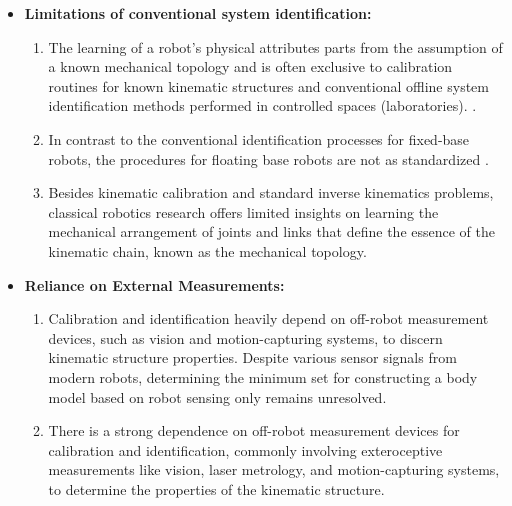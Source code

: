 \documentclass[12pt, a4paper]{article}
\begin{document}
\begin{itemize}
    \item \textbf{Limitations of conventional system identification:} 
	\begin{enumerate}
		\item The learning of a robot's physical attributes parts from the assumption of a known mechanical topology and is often exclusive to calibration routines for known kinematic structures \cite{Hollerbach1996CalibrationIndexTaxonomy} and conventional offline system identification methods performed in controlled spaces (laboratories). \cite{Swevers2007Dynamicmodelidentification,LeboutetInertialParameterIdentification}.
		\item In contrast to the conventional identification processes for fixed-base robots, the procedures for floating base robots are not as standardized \cite{Ayusawa2014Identifiabilityidentificationinertial,Lee2022OptimizedSystemIdentification}.    	
		\item Besides kinematic calibration and standard inverse kinematics problems, classical robotics research offers limited insights on learning the mechanical arrangement of joints and links that define the essence of the kinematic chain, known as the mechanical topology.

	\end{enumerate}
		
	\item \textbf{Reliance on External Measurements:}
	\begin{enumerate}
		\item  Calibration and identification heavily depend on off-robot measurement devices, such as vision and motion-capturing systems, to discern kinematic structure properties. Despite various sensor signals from modern robots, determining the minimum set for constructing a body model based on robot sensing only remains unresolved.	
		\item There is a strong dependence on off-robot measurement devices for calibration and identification, commonly involving exteroceptive measurements like vision, laser metrology, and motion-capturing systems, to determine the properties of the kinematic structure.	
	\end{enumerate}	
	

\end{itemize}
\end{document}
